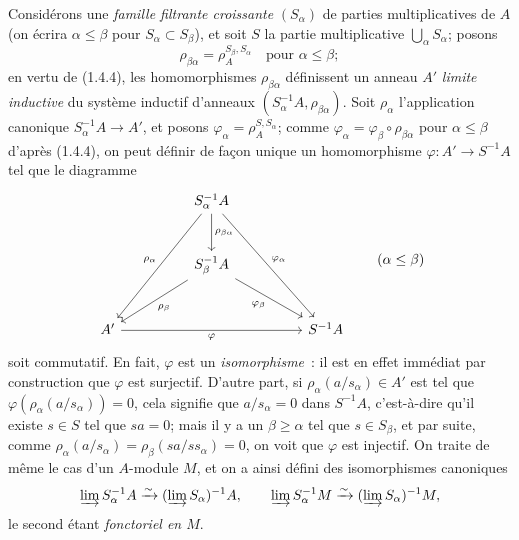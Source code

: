 \begin{env}[1.4.5]
\label{0.1.4.5-fr}
Considérons une \emph{famille filtrante croissante} $(S_\alpha)$ de parties multiplicatives de $A$ (on écrira $\alpha\leq\beta$ pour $S_\alpha\subset S_\beta$), et soit $S$ la partie multiplicative $\bigcup_\alpha S_\alpha$; posons
\[
  \rho_{\beta\alpha}=\rho_A^{S_\beta,S_\alpha}\quad\text{pour }\alpha\leq\beta;
\]
en vertu de (1.4.4), les homomorphismes $\rho_{\beta\alpha}$ définissent un anneau $A'$ \emph{limite inductive} du système inductif d'anneaux $(S_\alpha^{-1}A,\rho_{\beta\alpha})$.
Soit $\rho_\alpha$ l'application canonique $S_\alpha^{-1}A\to A'$, et posons $\varphi_\alpha=\rho_A^{S,S_\alpha}$; comme $\varphi_\alpha=\varphi_\beta\circ\rho_{\beta\alpha}$ pour $\alpha\leq\beta$ d'après (1.4.4), on peut définir de façon unique un homomorphisme $\varphi:A'\to S^{-1}A$ tel que le diagramme
\[
\begin{tikzcd}[column sep=huge,row sep=large]
  & S_\alpha^{-1}A
      \arrow[ddl,"\rho_\alpha"']
      \arrow[d,"\rho_{\beta\alpha}"]
      \arrow[ddr,"\varphi_\alpha"] & \\
  & S_\beta^{-1}A
      \arrow[dl,"\rho_\beta"]
      \arrow[dr,"\varphi_\beta"'] & \\
A' \arrow[rr,"\varphi"'] & & S^{-1}A
\end{tikzcd}
\qquad(\alpha\leq\beta)
\]
soit commutatif.
En fait, $\varphi$ est un \emph{isomorphisme}~: il est en effet immédiat par construction que $\varphi$ est surjectif.
D'autre part, si $\rho_\alpha(a/s_\alpha)\in A'$ est tel que $\varphi(\rho_\alpha(a/s_\alpha))=0$, cela signifie que $a/s_\alpha=0$ dans $S^{-1}A$, c'est-à-dire qu'il existe $s\in S$ tel que $sa=0$; mais il y a un $\beta\geq\alpha$ tel que $s\in S_\beta$, et par suite, comme $\rho_\alpha(a/s_\alpha)=\rho_\beta(sa/ss_\alpha)=0$, on voit que $\varphi$ est injectif.
On traite de même le cas d'un $A$-module $M$, et on a ainsi défini des isomorphismes canoniques
\[
  \varinjlim S_\alpha^{-1}A\xrightarrow{\sim}
  (\varinjlim S_\alpha)^{-1}A,
  \qquad
  \varinjlim S_\alpha^{-1}M\xrightarrow{\sim}
  (\varinjlim S_\alpha)^{-1}M,
\]
le second étant \emph{fonctoriel en $M$}.
\end{env}

